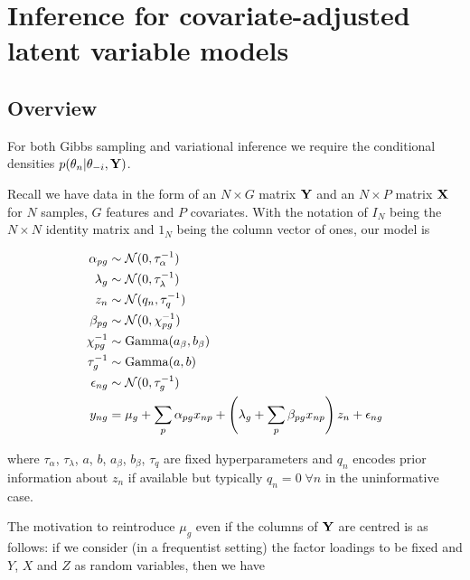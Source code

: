 
\chapter{Inference for covariate-adjusted latent variable models} \label{app:clvm}

\section{Overview}

For both Gibbs sampling and variational inference we require the conditional densities $p(\theta_n | \theta_{-i}, {\bf Y})$.

Recall we have data in the form of an $N \times G$ matrix ${\bf Y}$ and an $N \times P$ matrix ${\bf X}$ for $N$ samples, $G$ features and $P$ covariates. With the notation of $I_N$ being the $N \times N$ identity matrix and $1_N$ being the column vector of ones, our model is

\begin{equation}
\begin{aligned}
\alpha_{pg} & \sim \mathcal{N}(0, \tau_\alpha^{-1}) \\
\lambda_g & \sim \mathcal{N}(0, \tau_\lambda^{-1}) \\
z_n & \sim \mathcal{N}(q_n, \tau_q^{-1}) \\
\beta_{pg} & \sim \mathcal{N}(0, \chi_{pg}^{-1}) \\
\chi_{pg}^{-1} & \sim \text{Gamma}(a_\beta, b_\beta) \\
\tau_{g}^{-1} & \sim \text{Gamma}(a, b) \\
\epsilon_{ng} & \sim \mathcal{N}(0, \tau_g^{-1}) \\
y_{ng} & =  \mu_g + \sum_p \alpha_{pg} x_{np} + \left( \lambda_g + \sum_p \beta_{pg} x_{np} \right) z_n + \epsilon_{ng}
\end{aligned} \label{eq:clvm_model}
\end{equation}

where $\tau_\alpha$, $\tau_\lambda$, $a$, $b$, $a_\beta$, $b_\beta$, $\tau_q$ are fixed hyperparameters and $q_n$ encodes prior information about $z_n$ if available but typically $q_n = 0 \; \forall n$ in the uninformative case.



The motivation to reintroduce $\mu_g$ even if the columns of ${\bf Y}$ are centred is as follows: if we consider (in a frequentist setting) the factor loadings to be fixed and $Y$, $X$ and $Z$ as random variables, then we have


